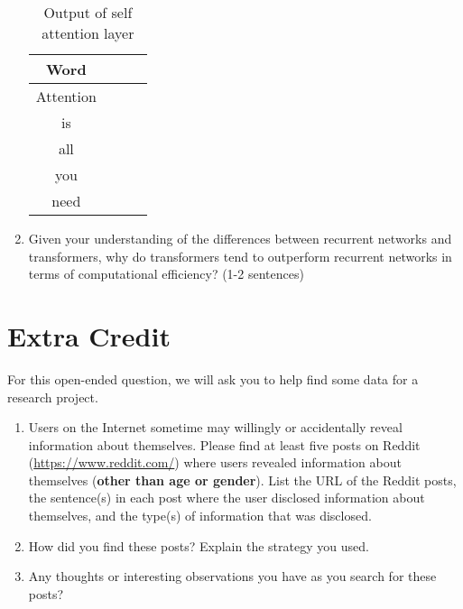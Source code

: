 \documentclass[12pt, letterpaper]{article}
\begin{document}
\begin{enumerate}
  \begin{table}[H]
\begin{center}
\begin{tabular}{ |c|c|c|c| } 
\hline
 Word &  \multicolumn{1}{c}{} \hspace{0.5cm} & \multicolumn{1}{c}{} \hspace{0.5cm} & \hspace{0.5cm} \\
\hline
Attention &   &   &   \\
\hline
is        &   &   &   \\
\hline
all       &   &   &   \\
\hline
you       &   &   &   \\
\hline
need      &   &   &   \\
\hline
\end{tabular}
\caption{Output of self attention layer}
\end{center}
\end{table}
 
  \item Given your understanding of the differences between recurrent networks and transformers, why do transformers tend to outperform recurrent networks in terms of computational efficiency? (1-2 sentences)
 
\end{enumerate}





\section{Extra Credit}

For this open-ended question, we will ask you to help find some data for a research project. 

\begin{enumerate}
    \item Users on the Internet sometime may willingly or accidentally reveal information about themselves. Please find at least five posts on Reddit (\url{https://www.reddit.com/}) where users revealed information about themselves (\textbf{other than age or gender}). List the URL of the Reddit posts, the sentence(s) in each post where the user disclosed information about themselves, and the type(s) of information that was disclosed. 
    
    \item How did you find these posts? Explain the strategy you used. 
    
    \item Any thoughts or interesting observations you have as you search for these posts?

\end{enumerate}
\end{document}
